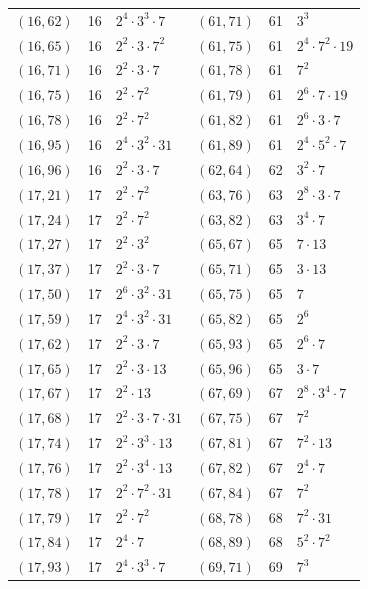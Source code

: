 \documentclass[11pt]{article}
\begin{document}
\begin{longtable}{@{}lrl@{\qquad}lrl@{}}
$(16,62)$ & 16 & $2^{4}\cdot 3^{3}\cdot 7$ & $(61,71)$ & 61 & $3^{3}$\\
$(16,65)$ & 16 & $2^{2}\cdot 3\cdot 7^{2}$ & $(61,75)$ & 61 & $2^{4}\cdot 7^{2}\cdot 19$\\
$(16,71)$ & 16 & $2^{2}\cdot 3\cdot 7$ & $(61,78)$ & 61 & $7^{2}$\\
$(16,75)$ & 16 & $2^{2}\cdot 7^{2}$ & $(61,79)$ & 61 & $2^{6}\cdot 7\cdot 19$\\
$(16,78)$ & 16 & $2^{2}\cdot 7^{2}$ & $(61,82)$ & 61 & $2^{6}\cdot 3\cdot 7$\\
$(16,95)$ & 16 & $2^{4}\cdot 3^{2}\cdot 31$ & $(61,89)$ & 61 & $2^{4}\cdot 5^{2}\cdot 7$\\
$(16,96)$ & 16 & $2^{2}\cdot 3\cdot 7$ & $(62,64)$ & 62 & $3^{2}\cdot 7$\\
$(17,21)$ & 17 & $2^{2}\cdot 7^{2}$ & $(63,76)$ & 63 & $2^{8}\cdot 3\cdot 7$\\
$(17,24)$ & 17 & $2^{2}\cdot 7^{2}$ & $(63,82)$ & 63 & $3^{4}\cdot 7$\\
$(17,27)$ & 17 & $2^{2}\cdot 3^{2}$ & $(65,67)$ & 65 & $7\cdot 13$\\
$(17,37)$ & 17 & $2^{2}\cdot 3\cdot 7$ & $(65,71)$ & 65 & $3\cdot 13$\\
$(17,50)$ & 17 & $2^{6}\cdot 3^{2}\cdot 31$ & $(65,75)$ & 65 & $7$\\
$(17,59)$ & 17 & $2^{4}\cdot 3^{2}\cdot 31$ & $(65,82)$ & 65 & $2^{6}$\\
$(17,62)$ & 17 & $2^{2}\cdot 3\cdot 7$ & $(65,93)$ & 65 & $2^{6}\cdot 7$\\
$(17,65)$ & 17 & $2^{2}\cdot 3\cdot 13$ & $(65,96)$ & 65 & $3\cdot 7$\\
$(17,67)$ & 17 & $2^{2}\cdot 13$ & $(67,69)$ & 67 & $2^{8}\cdot 3^{4}\cdot 7$\\
$(17,68)$ & 17 & $2^{2}\cdot 3\cdot 7\cdot 31$ & $(67,75)$ & 67 & $7^{2}$\\
$(17,74)$ & 17 & $2^{2}\cdot 3^{3}\cdot 13$ & $(67,81)$ & 67 & $7^{2}\cdot 13$\\
$(17,76)$ & 17 & $2^{2}\cdot 3^{4}\cdot 13$ & $(67,82)$ & 67 & $2^{4}\cdot 7$\\
$(17,78)$ & 17 & $2^{2}\cdot 7^{2}\cdot 31$ & $(67,84)$ & 67 & $7^{2}$\\
$(17,79)$ & 17 & $2^{2}\cdot 7^{2}$ & $(68,78)$ & 68 & $7^{2}\cdot 31$\\
$(17,84)$ & 17 & $2^{4}\cdot 7$ & $(68,89)$ & 68 & $5^{2}\cdot 7^{2}$\\
$(17,93)$ & 17 & $2^{4}\cdot 3^{3}\cdot 7$ & $(69,71)$ & 69 & $7^{3}$\\

\end{longtable}
\end{document}
